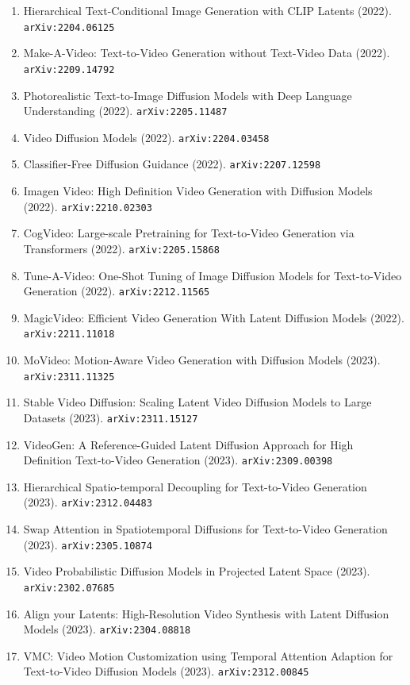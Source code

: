 \documentclass[11pt]{article}
\begin{document}
\begin{enumerate}
  \item Hierarchical Text-Conditional Image Generation with CLIP Latents (2022). \texttt{arXiv:2204.06125}
  \item Make-A-Video: Text-to-Video Generation without Text-Video Data (2022). \texttt{arXiv:2209.14792}
  \item Photorealistic Text-to-Image Diffusion Models with Deep Language
  Understanding (2022). \texttt{arXiv:2205.11487}
  \item Video Diffusion Models (2022). \texttt{arXiv:2204.03458}
  \item Classifier-Free Diffusion Guidance (2022). \texttt{arXiv:2207.12598}
  \item Imagen Video: High Definition Video Generation with Diffusion Models (2022). \texttt{arXiv:2210.02303}
  \item CogVideo: Large-scale Pretraining for Text-to-Video Generation via
  Transformers (2022). \texttt{arXiv:2205.15868}
  \item Tune-A-Video: One-Shot Tuning of Image Diffusion Models for
  Text-to-Video Generation (2022). \texttt{arXiv:2212.11565}
  \item MagicVideo: Efficient Video Generation With Latent Diffusion Models (2022). \texttt{arXiv:2211.11018}
  \item MoVideo: Motion-Aware Video Generation with Diffusion Models (2023). \texttt{arXiv:2311.11325}
  \item Stable Video Diffusion: Scaling Latent Video Diffusion Models to Large
  Datasets (2023). \texttt{arXiv:2311.15127}
  \item VideoGen: A Reference-Guided Latent Diffusion Approach for High
  Definition Text-to-Video Generation (2023). \texttt{arXiv:2309.00398}
  \item Hierarchical Spatio-temporal Decoupling for Text-to-Video Generation (2023). \texttt{arXiv:2312.04483}
  \item Swap Attention in Spatiotemporal Diffusions for Text-to-Video Generation (2023). \texttt{arXiv:2305.10874}
  \item Video Probabilistic Diffusion Models in Projected Latent Space (2023). \texttt{arXiv:2302.07685}
  \item Align your Latents: High-Resolution Video Synthesis with Latent
  Diffusion Models (2023). \texttt{arXiv:2304.08818}
  \item VMC: Video Motion Customization using Temporal Attention Adaption for
  Text-to-Video Diffusion Models (2023). \texttt{arXiv:2312.00845}

\end{enumerate}
\end{document}
